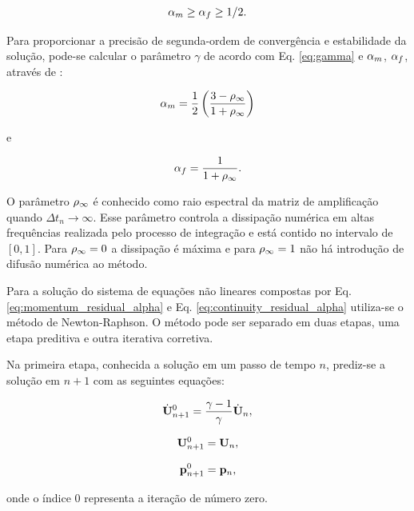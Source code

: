 \documentclass[tese_patricia]{subfiles}%
\begin{document}
\begin{gather}
\alpha_m \ge \alpha_f \ge 1/2.
\end{gather}

Para proporcionar a precisão de segunda-ordem de convergência e estabilidade da solução, pode-se calcular o parâmetro $\gamma$ de acordo com Eq. \ref {eq:gamma} e $\alpha_m$, $\alpha_f$, através de \cite{Hughes:2000}:


\begin{gather}
\alpha_m = \frac{1}{2}\left(\frac{3 - \rho_\infty}{1+\rho_\infty}\right)\label{eq:alpha_m_fluid}\\
\end{gather}

\noindent e

\begin{gather}
\alpha_f = \frac{1}{1+\rho_\infty}\label{eq:alpha_f_fluid}.
\end{gather}

O parâmetro $\rho_\infty$ é conhecido como raio espectral da matriz de amplificação quando $\Delta t_{n} \rightarrow \infty$. Esse parâmetro controla a dissipação numérica em altas frequências realizada pelo processo de integração e está contido no intervalo de $[0,1]$. Para $\rho_\infty = 0$ a dissipação é máxima e para $\rho_\infty = 1$ não há introdução de difusão numérica ao método.

Para a solução do sistema de equações não lineares compostas por Eq. \eqref{eq:momentum_residual_alpha} e Eq. \eqref{eq:continuity_residual_alpha} utiliza-se o método de Newton-Raphson. O método pode ser separado em duas etapas, uma etapa preditiva e outra iterativa corretiva.

Na primeira etapa, conhecida a solução em um passo de tempo $n$, prediz-se a solução em $n+1$ com as seguintes equações:

\begin{align}
\dot{\mathbf{U}}_{n+1}^{0} = \frac{\gamma-1}{\gamma}\dot{\mathbf{U}}_{n} \label{eq:Pred1},
\end{align}

\begin{align}
\mathbf{U}_{n+1}^{0} = \mathbf{U}_{n}, \label{eq:Pred2}
\end{align}

\begin{align}
\mathbf{p}_{n+1}^{0} = \mathbf{p}_{n},\label{eq:Pred3}
\end{align}

\noindent onde o índice $0$ representa a iteração de número zero. 
\end{document}
